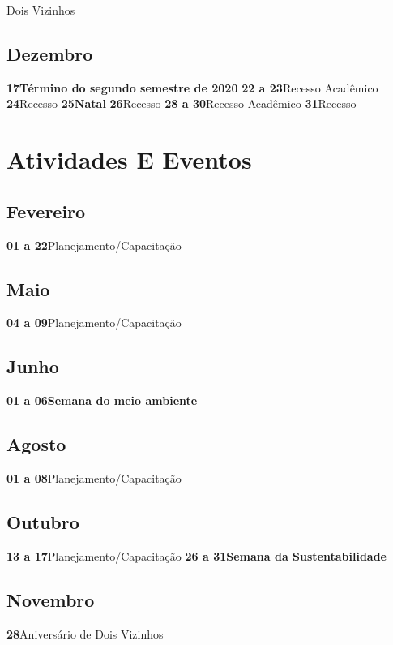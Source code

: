 \documentclass[thesis]{hmcposter}
\begin{document}
\begin{poster}
Dois Vizinhos \newline\subsection{Dezembro}\textbf{17}\quad \quad \quad \quad \textbf{Término do segundo semestre de 2020} \newline\textbf{22 a 23}\quad \quad Recesso Acadêmico \newline\textbf{24}\quad \quad \quad \quad Recesso \newline\textbf{25}\quad \quad \quad \quad \textbf{Natal} \newline\textbf{26}\quad \quad \quad \quad Recesso \newline\textbf{28 a 30}\quad \quad Recesso Acadêmico \newline\textbf{31}\quad \quad \quad \quad Recesso \newline\newpage
\section{\color{hmcorange}Atividades E Eventos}\subsection{Fevereiro}\textbf{01 a 22}\quad \quad Planejamento/Capacitação \newline\subsection{Maio}\textbf{04 a 09}\quad \quad Planejamento/Capacitação \newline\subsection{Junho}\textbf{01 a 06}\quad \quad \textbf{Semana do meio ambiente} \newline\subsection{Agosto}\textbf{01 a 08}\quad \quad Planejamento/Capacitação \newline\subsection{Outubro}\textbf{13 a 17}\quad \quad Planejamento/Capacitação \newline\textbf{26 a 31}\quad \quad \textbf{Semana da Sustentabilidade} \newline\subsection{Novembro}\textbf{28}\quad \quad \quad \quad Aniversário de Dois Vizinhos \newline\end{poster}
\end{document}
